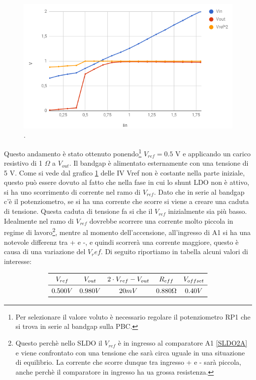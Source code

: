 \begin{figure}
\centering
\includegraphics[scale=.5]{Immagini/SLDO2Astatic}
\caption{.}
\label{SLDO2Astatic}
\end{figure}

Questo andamento è stato ottenuto ponendo\footnote{Per selezionare il valore voluto è necessario regolare il potenziometro RP1 che si trova in serie al bandgap sulla PBC.} $V_{ref} = 0.5$ V e applicando un carico resistivo di 1 $\Omega$ a $V_{out}$. Il bandgap è alimentato esternamente con una tensione di 5 V. 
Come si vede dal grafico \ref{SLDO2Astatic} delle IV Vref non è costante nella parte iniziale, questo può essere dovuto al fatto che nella fase in cui lo shunt LDO non è attivo, si ha uno scorrimento di corrente nel ramo di $V_{ref}$. Dato che in serie al bandgap c'è il potenziometro, se si ha una corrente che scorre si viene a creare una caduta di tensione. Questa caduta di tensione fa si che il $V_{ref}$ inizialmente sia più basso. Idealmente nel ramo di $V_{ref}$ dovrebbe scorrere una corrente molto piccola in regime di lavoro\footnote{Questo perchè nello SLDO il $V_{ref}$ è in ingresso al comparatore A1 \ref{SLDO2A} e viene confrontato con una tensione che sarà circa uguale in una situazione di equilibrio. La corrente che scorre dunque tra ingresso + e - sarà piccola, anche perchè il comparatore in ingresso ha ua grossa resistenza.}, mentre al momento dell'accensione, all'ingresso di A1 si ha una notevole differenz tra + e -, e quindi scorrerà una corrente maggiore, questo è causa di una variazione del $V_ref$. Di seguito riportiamo in tabella alcuni valori di interesse: 

\[
\begin{array}{ccccc}

\toprule
V_{ref} & V_{out} & 2 \cdot V_{ref}- V_{out} & R_{eff} & V_{offset} \\

\midrule

0.500 V & 0.980 V & 20 mV & 0.880 \Omega & 0.40 V \\

\bottomrule
\end{array}
\]

